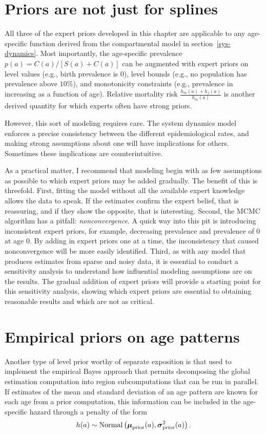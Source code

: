 \section{Priors are not just for splines}
All three of the expert priors developed in this chapter are
applicable to any age-specific function derived from the compartmental
model in section~\ref{sys-dynamics}. Most importantly, the
age-specific prevalence $p(a) = C(a)/\left[S(a)+C(a)\right]$ can be augmented with expert
priors on level values (e.g., birth prevalence is $0$), level bounds
(e.g., no population has prevalence above $10$\%), and monotonicity
constraints (e.g., prevalence in increasing as a function of
age). Relative mortality risk $\frac{h_m(a)+h_f(a)}{h_m(a)}$ is another derived quantity
for which experts often have strong priors.

However, this sort of modeling requires care. The system dynamics
model enforces a precise consistency between the different
epidemiological rates, and making strong assumptions about one will
have implications for others.  Sometimes these implications are
counterintuitive.

As a practical matter, I recommend that modeling begin with as few
assumptions as possible to which expert priors may be added gradually. The
benefit of this is threefold.  First, fitting the model without all
the available expert knowledge allows the data to speak.  If the estimates
confirm the expert belief, that is reassuring, and if they show the
opposite, that is interesting. Second, the MCMC algorithm has a
pitfall: \emph{nonconvergence}. A quick way into this pit is
introducing inconsistent expert priors, for example, decreasing
prevalence and prevalence of $0$ at age $0$. By adding in expert
priors one at a time, the inconsistency that caused nonconvergence
will be more easily identified. Third, as with any model that produces
estimates from sparse and noisy data, it is essential to conduct a
sensitivity analysis to understand how influential modeling
assumptions are on the results.  The gradual addition of expert priors
will provide a starting point for this sensitivity analysis, showing
which expert priors are essential to obtaining reasonable results and
which are not as critical.

\section{Empirical priors on age patterns}
Another type of level prior worthy of separate exposition is that used
to implement the empirical Bayes approach that permits decomposing the
global estimation computation into region subcomputations that can be
run in parallel.  If estimates of the mean and standard deviation of
an age pattern are known for each age from a prior computation, this
information can be included in the age-specific hazard through a
penalty of the form
\[
h(a) \sim \operatorname{Normal}\left(\boldsymbol{\mu}_{\text{prior}}(a),
\boldsymbol{\sigma}_{\text{prior}}^2(a)\right).
\]

